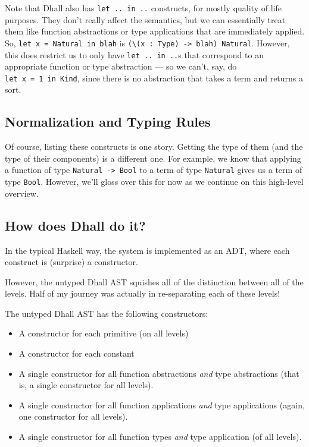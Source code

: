 \documentclass[]{article}
\begin{document}
Note that Dhall also has \texttt{let\ ..\ in\ ..} constructs, for mostly quality
of life purposes. They don't really affect the semantics, but we can essentially
treat them like function abstractions or type applications that are immediately
applied. So, \texttt{let\ x\ =\ Natural\ in\ blah} is
\texttt{(\textbackslash{}(x\ :\ Type)\ -\textgreater{}\ blah)\ Natural}.
However, this does restrict us to only have \texttt{let\ ..\ in\ ..}s that
correspond to an appropriate function or type abstraction --- so we can't, say,
do \texttt{let\ x\ =\ 1\ in\ Kind}, since there is no abstraction that takes a
term and returns a sort.

\subsection{Normalization and Typing
Rules}\label{normalization-and-typing-rules}

Of course, listing these constructs is one story. Getting the type of them (and
the type of their components) is a different one. For example, we know that
applying a function of type \texttt{Natural\ -\textgreater{}\ Bool} to a term of
type \texttt{Natural} gives us a term of type \texttt{Bool}. However, we'll
gloss over this for now as we continue on this high-level overview.

\subsection{How does Dhall do it?}\label{how-does-dhall-do-it}

In the typical Haskell way, the system is implemented as an ADT, where each
construct is (surprise) a constructor.

However, the untyped Dhall AST squishes all of the distinction between all of
the levels. Half of my journey was actually in re-separating each of these
levels!

The untyped Dhall AST has the following constructors:

\begin{itemize}
\tightlist
\item
  A constructor for each primitive (on all levels)
\item
  A constructor for each constant
\item
  A single constructor for all function abstractions \emph{and} type
  abstractions (that is, a single constructor for all levels).
\item
  A single constructor for all function applications \emph{and} type
  applications (again, one constructor for all levels).
\item
  A single constructor for all function types \emph{and} type application (of
  all levels).
\end{itemize}
\end{document}
